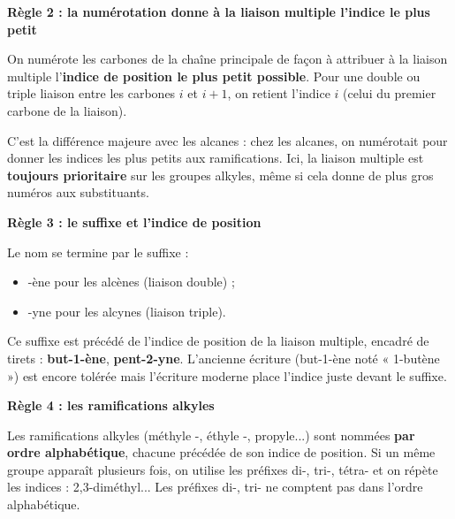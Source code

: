 \documentclass[11pt]{article}
\newcommand{\cle}[1]{{\popxbold\color{popdark}#1}}
\begin{document}
\textbf{Règle 2 : la numérotation donne à la liaison multiple l'indice le plus petit}\par

\begin{definition}
On numérote les carbones de la chaîne principale de façon à attribuer à la \cle{liaison multiple} l'\textbf{indice de position le plus petit possible}. Pour une double ou triple liaison entre les carbones $i$ et $i+1$, on retient l'indice $i$ (celui du premier carbone de la liaison).
\end{definition}

C'est la différence majeure avec les alcanes : chez les alcanes, on numérotait pour donner les indices les plus petits aux ramifications. Ici, la liaison multiple est \textbf{toujours prioritaire} sur les groupes alkyles, même si cela donne de plus gros numéros aux substituants.

\textbf{Règle 3 : le suffixe et l'indice de position}\par

\begin{definition}
Le nom se termine par le suffixe :
\begin{itemize}
\item \cle{-ène} pour les alcènes (liaison double) ;
\item \cle{-yne} pour les alcynes (liaison triple).
\end{itemize}
Ce suffixe est précédé de l'indice de position de la liaison multiple, encadré de tirets : \textbf{but-1-ène}, \textbf{pent-2-yne}. L'ancienne écriture (but-1-ène noté « 1-butène ») est encore tolérée mais l'écriture moderne place l'indice juste devant le suffixe.
\end{definition}

\textbf{Règle 4 : les ramifications alkyles}\par

\begin{definition}
Les ramifications alkyles (méthyle -, éthyle -, propyle...) sont nommées \textbf{par ordre alphabétique}, chacune précédée de son indice de position. Si un même groupe apparaît plusieurs fois, on utilise les préfixes di-, tri-, tétra- et on répète les indices : 2,3-diméthyl... Les préfixes di-, tri- ne comptent pas dans l'ordre alphabétique.
\end{definition}
\end{document}

